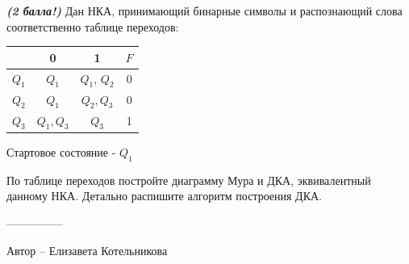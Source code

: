 \question
\textbf{\textit{(2 балла!)}} Дан НКА, принимающий бинарные символы и распознающий слова соответственно таблице переходов:

\begin{tabular}{||c | c c c||} 
 \hline
 & 0 & 1 & $F$ \\  
 \hline\hline
 $Q_1$ & $Q_1$ & $Q_1$, $Q_2$ & 0 \\ 
 \hline
 $Q_2$ &  $Q_1$ & $Q_2, Q_3$ & 0 \\
 \hline
 $Q_3$ & $Q_1, Q_3$ & $Q_3$ & 1 \\
 \hline
\end{tabular}

Стартовое состояние - $Q_1$

По таблице переходов постройте диаграмму Мура и ДКА, эквивалентный данному НКА. Детально распишите алгоритм построения ДКА.

---------------

Автор -- Елизавета Котельникова
